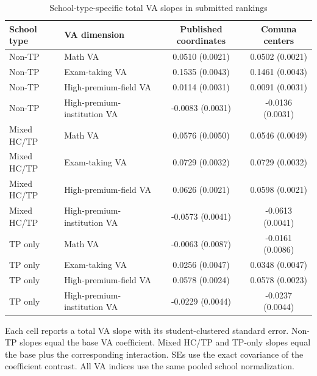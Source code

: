 \begin{table}[!htbp]
\centering
\small
\caption{School-type-specific total VA slopes in submitted rankings}
\label{tab:school-type-total-va-slopes}
\begin{tabular}{llcc}
\toprule
School type & VA dimension & Published coordinates & Comuna centers \\
\midrule
Non-TP & Math VA & 0.0510 (0.0021) & 0.0502 (0.0021) \\
Non-TP & Exam-taking VA & 0.1535 (0.0043) & 0.1461 (0.0043) \\
Non-TP & High-premium-field VA & 0.0114 (0.0031) & 0.0091 (0.0031) \\
Non-TP & High-premium-institution VA & -0.0083 (0.0031) & -0.0136 (0.0031) \\
\midrule
Mixed HC/TP & Math VA & 0.0576 (0.0050) & 0.0546 (0.0049) \\
Mixed HC/TP & Exam-taking VA & 0.0729 (0.0032) & 0.0729 (0.0032) \\
Mixed HC/TP & High-premium-field VA & 0.0626 (0.0021) & 0.0598 (0.0021) \\
Mixed HC/TP & High-premium-institution VA & -0.0573 (0.0041) & -0.0613 (0.0041) \\
\midrule
TP only & Math VA & -0.0063 (0.0087) & -0.0161 (0.0086) \\
TP only & Exam-taking VA & 0.0256 (0.0047) & 0.0348 (0.0047) \\
TP only & High-premium-field VA & 0.0578 (0.0024) & 0.0578 (0.0023) \\
TP only & High-premium-institution VA & -0.0229 (0.0044) & -0.0237 (0.0044) \\
\bottomrule
\end{tabular}
\par\smallskip
\begin{minipage}{0.98\linewidth}\footnotesize
Each cell reports a total VA slope with its student-clustered standard error. Non-TP slopes equal the base VA coefficient. Mixed HC/TP and TP-only slopes equal the base plus the corresponding interaction. SEs use the exact covariance of the coefficient contrast. All VA indices use the same pooled school normalization.
\end{minipage}
\end{table}
